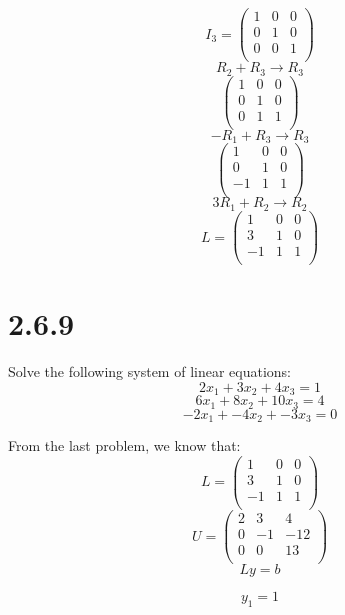 \documentclass[journal]{IEEEtran}
\begin{document}
{			\[
				I_3 = \left(
					\begin{array}{ccc}
						1&	0& 0	\\
						0&	1& 0	\\
						0&	0& 1	\\
					\end{array}
				\right)
			\]
			\[
				R_2 + R_3 \rightarrow R_3
			\]
			\[
				\left(
					\begin{array}{ccc}
						1&	0& 0	\\
						0&	1& 0	\\
						0&	1& 1	\\
					\end{array}
				\right)
			\]
			\[
			-R_1 + R_3 \rightarrow R_3
			\]
			\[
				\left(
					\begin{array}{ccc}
						1&	0& 0	\\
						0&	1& 0	\\
						-1&	1& 1	\\
					\end{array}
				\right)
			\]
			\[
			3R_1+R_2 \rightarrow R_2
			\]
			\[
				L = \left(
					\begin{array}{ccc}
						1&	0& 0	\\
						3&	1& 0	\\
						-1&	1& 1	\\
					\end{array}
				\right)
			\]
		\newpage
		\section*{\Large{\textbf{2.6.9}}}
			Solve the following system of linear equations:
			\[2x_1 + 3x_2 + 4x_3 = 1\]
			\[6x_1 + 8x_2 + 10x_3 = 4\]
			\[-2x_1 + -4x_2 + -3x_3 = 0\]

			From the last problem, we know that:
			\[
				L = \left(
					\begin{array}{ccc}
						1&	0& 0	\\
						3&	1& 0	\\
						-1&	1& 1	\\
					\end{array}
				\right)
			\]
			\[
				U = \left( 
					\begin{array}{ccc}
						2&	3&	4 \\
						0&	-1&	-12 \\
						0&	0&	13 \\
					\end{array} 
				\right)
			\]
			\[Ly=b\]

			\[y_1=1\]

}
\end{document}
